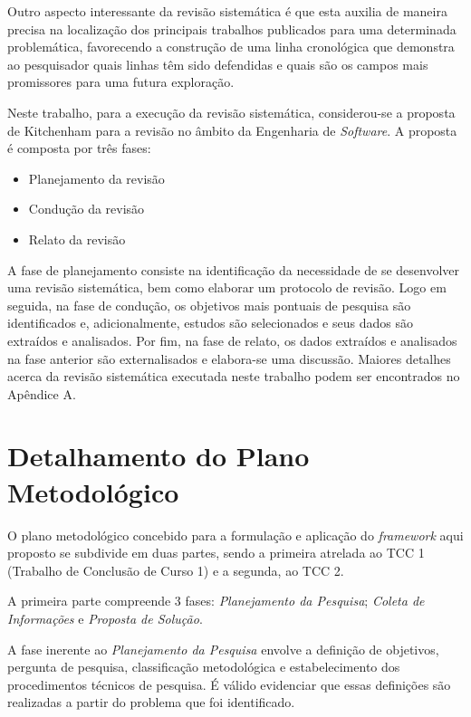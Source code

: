 Outro aspecto interessante da revisão sistemática é que esta auxilia de maneira precisa na localização dos principais trabalhos publicados para uma determinada problemática, favorecendo a construção de uma linha cronológica que demonstra ao pesquisador quais linhas têm sido defendidas e quais são os campos mais promissores para uma futura exploração.

Neste trabalho, para a execução da revisão sistemática, considerou-se a proposta de Kitchenham para a revisão no âmbito da Engenharia de \textit{Software}. A proposta é composta por três fases:

\begin{itemize}
	\item Planejamento da revisão
	\item Condução da revisão
	\item Relato da revisão
\end{itemize}

A fase de planejamento consiste na identificação da necessidade de se desenvolver uma revisão sistemática, bem como elaborar um protocolo de revisão. Logo em seguida, na fase de condução, os objetivos mais pontuais de pesquisa são identificados e, adicionalmente, estudos são selecionados e seus dados são extraídos e analisados. Por fim, na fase de relato, os dados extraídos e analisados na fase anterior são externalisados e elabora-se uma discussão. Maiores detalhes acerca da revisão sistemática executada neste trabalho podem ser encontrados no Apêndice A.

\section{Detalhamento do Plano Metodológico}

O plano metodológico concebido para a formulação e aplicação do \textit{framework} aqui proposto se subdivide em duas partes, sendo a primeira atrelada ao TCC 1 (Trabalho de Conclusão de Curso 1) e a segunda, ao TCC 2.

A primeira parte compreende 3 fases: \textit{Planejamento da Pesquisa}; \textit{Coleta de Informações} e \textit{Proposta de Solução}.

A fase inerente ao \textit{Planejamento da Pesquisa} envolve a definição de objetivos, pergunta de pesquisa, classificação metodológica e estabelecimento dos procedimentos técnicos de pesquisa. É válido evidenciar que essas definições são realizadas a partir do problema que foi identificado.

